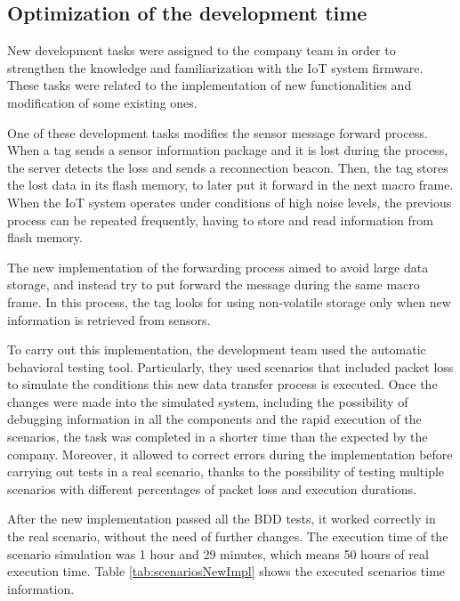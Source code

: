 \documentclass[journal]{IEEEtran}	%
\begin{document}
\subsection{Optimization of the development time}


New development tasks were assigned to the company team in order to strengthen the knowledge and familiarization with the IoT system firmware. These tasks were related to the implementation of new functionalities and modification of some existing ones.

One of these development tasks modifies the sensor message forward process. When a tag sends a sensor information package and it is lost during the process, the server detects the loss and sends a reconnection beacon. Then, the tag stores the lost data in its flash memory, to later put it forward in the next macro frame. When the IoT system operates under conditions of high noise levels, the previous process can be repeated frequently, having to store and read information from flash memory.

The new implementation of the forwarding process aimed to avoid large data storage, and instead try to put forward the message during the same macro frame. In this process, the tag looks for using non-volatile storage only when new information is retrieved from sensors.

To carry out this implementation, the development team used the automatic behavioral testing tool. Particularly, they used scenarios that included packet loss to simulate the conditions this new data transfer process is executed. Once the changes were made into the simulated system, including the possibility of debugging information in all the components and the rapid execution of the scenarios, the task was completed in a shorter time than the expected by the company. Moreover, it allowed to correct errors during the implementation before carrying out tests in a real scenario, thanks to the possibility of testing multiple scenarios with different percentages of packet loss and execution durations.

After the new implementation passed all the BDD tests, it worked correctly in the real scenario, without the need of further changes. The execution time of the scenario simulation was 1 hour and 29 minutes, which means 50 hours of real execution time. Table \ref{tab:scenariosNewImpl} shows the executed scenarios time information.
\end{document}
